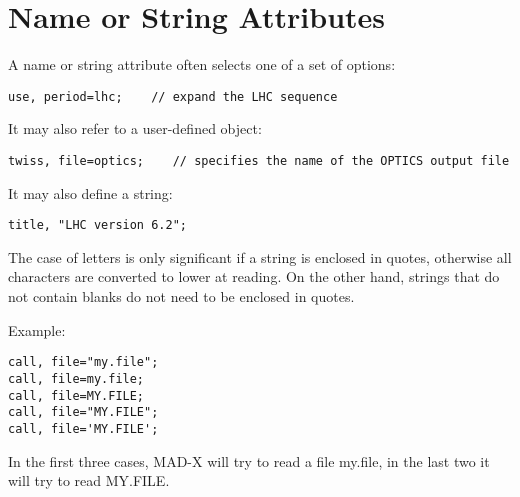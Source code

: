 
\section{Name or String Attributes}

A name or string attribute often selects one of a set of options: 
\begin{verbatim}
use, period=lhc;    // expand the LHC sequence
\end{verbatim} 

It may also refer to a user-defined object: 
\begin{verbatim}
twiss, file=optics;    // specifies the name of the OPTICS output file
\end{verbatim} 

It may also define a string: 
\begin{verbatim}
title, "LHC version 6.2";
\end{verbatim} 

The case of letters is only significant if a string is enclosed in
quotes, otherwise all characters are converted to lower at reading. On
the other hand, strings that do not contain blanks do not need to be
enclosed in quotes. 

Example:
\begin{verbatim}
call, file="my.file";
call, file=my.file;
call, file=MY.FILE;
call, file="MY.FILE";
call, file='MY.FILE';
\end{verbatim} 
In the first three cases, MAD-X will try to read a file my.file, in the
last two it will try to read MY.FILE.  

